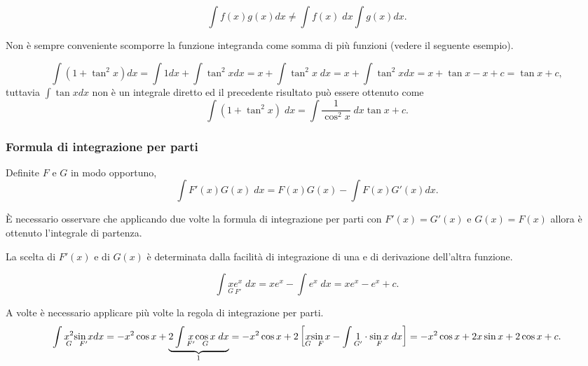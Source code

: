 \begin{property}
    \begin{equation*}
        \int f(x)g(x)dx\neq\int f(x) \; dx\int g(x)dx.
    \end{equation*}
\end{property}

Non è sempre conveniente scomporre la funzione integranda come somma di più funzioni (vedere il seguente esempio).
\begin{example}
    \begin{equation*}
        \int(1+\tan^2x)dx=\int 1dx+\int\tan^2xdx = x+\int\tan^2x \; dx= x + \int\tan^2 xdx=x+\tan x-x+c=\tan x+c,
    \end{equation*}
    tuttavia $\int\tan xdx$ non è un integrale diretto ed il precedente risultato può essere ottenuto come
    \begin{equation*}
        \int(1 + \tan^2x) \; dx = \int \frac{1}{\cos^2x} \; dx\tan x + c.
    \end{equation*}
\end{example}

\subsubsection{Formula di integrazione per parti}
\begin{definition}
    Definite $F$ e $G$ in modo opportuno,
    \begin{equation}\label{eq:formula_integrazione_parti}
        \int  F'(x)G(x) \; dx=F(x)G(x) - \int F(x)G'(x)dx.
    \end{equation}
\end{definition}

È necessario osservare che applicando due volte la formula di integrazione per parti con $F'(x)=G'(x)$ e $G(x)=F(x)$ allora è ottenuto l'integrale di partenza.

La scelta di $F'(x)$ e di $G(x)$ è determinata dalla facilità di integrazione di una e di derivazione dell'altra funzione.

\begin{example}
    \begin{equation*}
        \int \underset{G}{x} \underset{F'}{e^x} \; dx = xe^x - \int e^x \; dx=xe^x -e^x + c.
    \end{equation*}
\end{example}

\begin{example}
    A volte è necessario applicare più volte la regola di integrazione per parti.
    \begin{equation*}
        \int \underset{G}{x^2}\underset{F'}{\sin x}dx=-x^2\cos x+\underbrace{2\int\underset{F'}{x}\underset{G}{\cos x} \; dx}_{\footnotemark}=-x^2\cos x + 2 \left[\underset{G}{x}\underset{F}{\sin x} - \int \underset{G'}{1}\cdot\underset{F}{\sin x} \; dx \right]=-x^2\cos x+ 2x\sin x + 2\cos x + c.
    \end{equation*}
\end{example}

